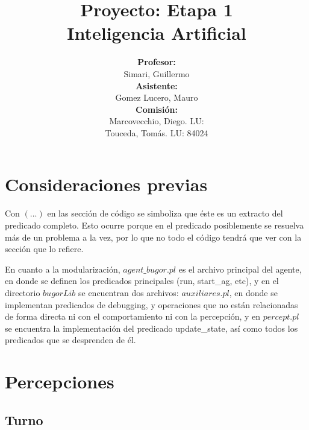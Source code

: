 \documentclass[a4paper,10pt,spanish]{article}
\begin{document}
\begin{titlepage}

\title{{\bf Proyecto: Etapa 1}\\ Inteligencia Artificial\vspace{10mm}}
\author{{\bf Profesor:}\\ Simari, Guillermo\\
{\bf Asistente:}\\ Gomez Lucero, Mauro\\
{\bf Comisi\'on:}\\ Marcovecchio, Diego. LU: \\ Touceda, Tom\'as. LU: 84024}
\date{}

\maketitle

\thispagestyle{empty}

\end{titlepage}

\newpage

\tableofcontents

\newpage

\section{Consideraciones previas}

	Con $(...)$ en las secci\'on de c\'odigo se simboliza que \'este es un extracto del predicado completo. Esto ocurre porque en el predicado posiblemente se resuelva m\'as de un problema a la vez, por lo que no todo el c\'odigo tendr\'a que ver con la secci\'on que lo refiere.
	
	En cuanto a la modularizaci\'on, $agent\_bugor.pl$ es el archivo principal del agente, en donde se definen los predicados principales (run, start\_ag, etc), y en el directorio $bugorLib$ se encuentran dos archivos: $auxiliares.pl$, en donde se implementan predicados de debugging, y operaciones que no est\'an relacionadas de forma directa ni con el comportamiento ni con la percepci\'on, y en $percept.pl$ se encuentra la implementaci\'on del predicado update\_state, as\'i como todos los predicados que se desprenden de \'el.

\section{Percepciones}
	\subsection{Turno}
	
\end{document}
